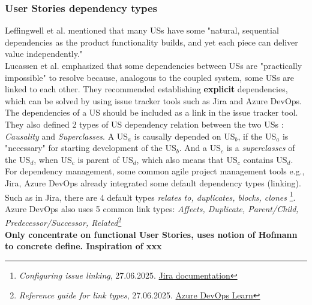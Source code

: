 \documentclass[a4paper, 11 pt, leqno, titlepage = true, toc=bib, oneside]{scrbook}
\begin{document}
\subsubsection{User Stories dependency types}
Leffingwell et al. mentioned that many USs have some "natural, sequential dependencies as the product functionality builds, and yet each piece can deliver value independently." \cite{Leffingwell2009}\\
Lucassen et al.\cite{LucassenFramework} emphasized that some dependencies between USs are "practically impossible" to resolve because, analogous to the coupled system, some USs are linked to each other. They recommended establishing \textbf{explicit} dependencies, which can be solved by using issue tracker tools such as Jira and Azure DevOps. The dependencies of a US should be included as a link in the issue tracker tool. They also defined 2 types of US dependency relation between the two USs : \textit{Causality} and \textit{Superclasses}. A US$_{a}$ is causally depended on US$_{b}$, if the US$_{a}$ is "necessary" for starting development of the US$_{b}$. And a US$_{c}$ is a \textit{superclasses} of the US$_{d}$, when US$_{c}$ is parent of US$_{d}$, which also means that US$_{c}$ contains US$_{d}$. \\
For dependency management, some common agile project management tools e.g., Jira, Azure DevOps already integrated some default dependency types (linking). Such as in Jira, there are 4 default types \textit{relates to, duplicates, blocks, clones} \footnote{\emph{Configuring issue linking}, 27.06.2025. \href{https://confluence.atlassian.com/adminjiraserver/configuring-issue-linking-938847862.html?utm_source=chatgpt.com\#Configuringissuelinking-disable}{Jira documentation}}. Azure DevOps also uses 5 common link types: \textit{Affects, Duplicate, Parent/Child, Predecessor/Successor, Related}\footnote{\emph{Reference guide for link types}, 27.06.2025. \href{https://learn.microsoft.com/en-us/azure/devops/boards/queries/link-type-reference?view=azure-devops&utm_source=chatgpt.com}{Azure DevOps Learn}}\\
\textbf{Only concentrate on functional User Stories, uses notion of Hofmann to concrete define. Inspiration of xxx}
\end{document}
